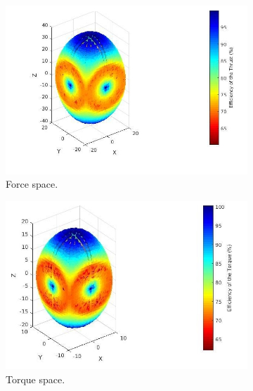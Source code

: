 \begin{figure}[!h]
  \begin{subfigure}[b]{0.48\textwidth}
    \includegraphics[width=\linewidth]{images/n=4_force.jpg}
    \caption{Force space.} \label{fig:tool_outputa}
  \end{subfigure}
  \hspace*{\fill} %
  \begin{subfigure}[b]{0.48\textwidth}
    \includegraphics[width=\linewidth]{images/n=4_torque.jpg}
    \caption{Torque space.} \label{fig:tool_outputb}
  \end{subfigure}
  \hspace*{\fill} %
  \begin{subfigure}[b]{0.48\textwidth}

\end{subfigure}
\end{figure}
